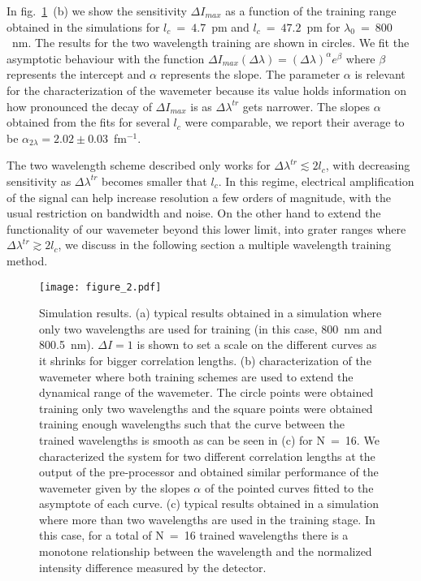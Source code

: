 \documentclass{optica-article}
\begin{document}
In fig.~\ref{fig:Results}~(b) we show the sensitivity $\Delta I_{max}$ as a function of the training range obtained in the simulations for $l_c$~=~$4.7$~pm and $l_c$~=~$47.2$~pm for $\lambda_0$~=~$800$~nm. The results for the two wavelength training are shown in circles. We fit the asymptotic behaviour with the function
$    \Delta I_{max}(\Delta \lambda) = (\Delta \lambda)^\alpha e^\beta     \label{eq:fit} $
where $\beta$ represents the intercept and $\alpha$ represents the slope. The parameter $\alpha$ is relevant for the characterization of the wavemeter because its value holds information on how pronounced the decay of $\Delta I_{max}$ is as $\Delta \lambda^{tr}$ gets narrower. The slopes $\alpha$ obtained from the fits for several $l_c$ were comparable, we report their average to be $\alpha_{2 \lambda} = 2.02\pm0.03$~fm$^{-1}$. 



The two wavelength scheme described only works for $\Delta \lambda^{tr} \lesssim 2 l_c$, with decreasing sensitivity as $\Delta \lambda^{tr}$ becomes smaller that $l_c$. In this regime, electrical amplification of the signal can help increase resolution a few orders of magnitude, with the usual restriction on bandwidth and noise. On the other hand to extend the functionality of our wavemeter beyond this lower limit, into grater ranges where $\Delta \lambda^{tr} \gtrsim 2 l_c$, we discuss in the following section a multiple wavelength training method.


\begin{figure}[ht]
    \centering
    \texttt{[image: figure\_2.pdf]}
    \caption{Simulation results. (a) typical results obtained in a simulation where only two wavelengths are used for training (in this case, 800~nm and 800.5~nm). $\Delta I = 1$ is shown to set a scale on the different curves as it shrinks for bigger correlation lengths. (b) characterization of the wavemeter where both training schemes are used to extend the dynamical range of the wavemeter. The circle points were obtained training only two wavelengths and the square points were obtained training enough wavelengths such that the curve between the trained wavelengths is smooth as can be seen in (c) for N~=~16. We characterized the system for two different correlation lengths at the output of the pre-processor and obtained similar performance of the wavemeter given by the slopes $\alpha$ of the pointed curves fitted to the asymptote of each curve. (c) typical results obtained in a simulation where more than two wavelengths are used in the training stage. In this case, for a total of N~=~16 trained wavelengths there is a monotone relationship between the wavelength and the normalized intensity difference measured by the detector.}
    \label{fig:Results}
\end{figure}
\end{document}
